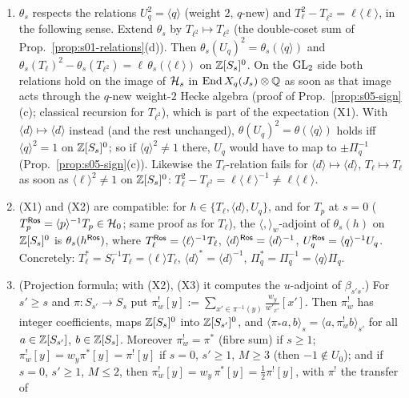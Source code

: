 \begin{lemma}\label{lem:s05-consistency}
\begin{enumerate}[label=(\alph*)]
\item $\theta_s$ respects the relations $U_q^2=\langle q\rangle$ (weight $2$, $q$-new) and $T_\ell^2-T_{\ell^2}=\ell\langle\ell\rangle$, in
  the following sense. Extend $\theta_s$ by $T_{\ell^2}\mapsto T_{\ell^2}$ (the double-coset sum of Prop.~\ref{prop:s01-relations}(d)).
  Then $\theta_s(U_q)^2=\theta_s(\langle q\rangle)$ and $\theta_s(T_\ell)^2-\theta_s(T_{\ell^2})=\ell\,\theta_s(\langle\ell\rangle)$ on
  $\mathbb{Z}[S_s]^0$. On the $\mathrm{GL}_2$ side both relations hold on the image of $\mathcal{H}_s$ in $\operatorname{End}X_q(J_s)\otimes\mathbb{Q}$ as soon as that image acts through
  the $q$-new weight-$2$ Hecke algebra (proof of Prop.~\ref{prop:s05-sign}(c); classical recursion for $T_{\ell^2}$), which is part of
  the expectation (X1). With $\langle d\rangle\mapsto\langle d\rangle$ instead (and the rest unchanged), $\theta(U_q)^2=\theta(\langle q\rangle)$ holds iff
  $\langle q\rangle^2=1$ on $\mathbb{Z}[S_s]^0$; so if $\langle q\rangle^2\ne1$ there, $U_q$ would have to map to $\pm\Pi_q^{-1}$ (Prop.~\ref{prop:s05-sign}(c)).
  Likewise the $T_\ell$-relation fails for $\langle d\rangle\mapsto\langle d\rangle$, $T_\ell\mapsto T_\ell$ as soon as $\langle\ell\rangle^2\ne1$ on $\mathbb{Z}[S_s]^0$:
  $T_\ell^2-T_{\ell^2}=\ell\langle\ell\rangle^{-1}\ne\ell\langle\ell\rangle$.
\item (X1) and (X2) are compatible: for $h\in\{T_\ell,\langle d\rangle,U_q\}$, and for $T_p$ at $s=0$ ($T_p^{\mathsf{Ros}}=\langle p\rangle^{-1}T_p\in\mathcal{H}_0$; same proof as for $T_\ell$), the $\langle,\rangle_w$-adjoint of $\theta_s(h)$ on $\mathbb{Z}[S_s]^0$ is
  $\theta_s(h^{\mathsf{Ros}})$, where $T_\ell^{\mathsf{Ros}}=\langle\ell\rangle^{-1}T_\ell$, $\langle d\rangle^{\mathsf{Ros}}=\langle d\rangle^{-1}$, $U_q^{\mathsf{Ros}}=\langle q\rangle^{-1}U_q$. Concretely:
  $T_\ell^*=S_\ell^{-1}T_\ell=\langle\ell\rangle T_\ell$, $\langle d\rangle^*=\langle d\rangle^{-1}$, $\Pi_q^*=\Pi_q^{-1}=\langle q\rangle\Pi_q$.
\item (Projection formula; with (X2), (X3) it computes the $u$-adjoint of $\beta_{s's}$.) For $s'\ge s$ and $\pi:S_{s'}\to S_s$ put
  $\pi^!_w[y]:=\sum_{x'\in\pi^{-1}(y)}\frac{w_y}{w'_{x'}}[x']$. Then $\pi^!_w$ has integer coefficients, maps $\mathbb{Z}[S_s]^0$ into
  $\mathbb{Z}[S_{s'}]^0$, and $\langle\pi_*a,b\rangle_s=\langle a,\pi^!_wb\rangle_{s'}$ for all $a\in\mathbb{Z}[S_{s'}]$, $b\in\mathbb{Z}[S_s]$. Moreover $\pi^!_w=\pi^*$
  (fibre sum) if $s\ge1$; $\pi^!_w[y]=w_y\pi^*[y]=\pi^![y]$ if $s=0$, $s'\ge1$, $M\ge3$ (then $-1\notin U_0$); and if $s=0$, $s'\ge1$, $M\le2$, then $\pi^!_w[y]=w_y\,\pi^*[y]=\frac12\pi^![y]$, with $\pi^!$ the transfer of

\end{enumerate}
\end{lemma}
